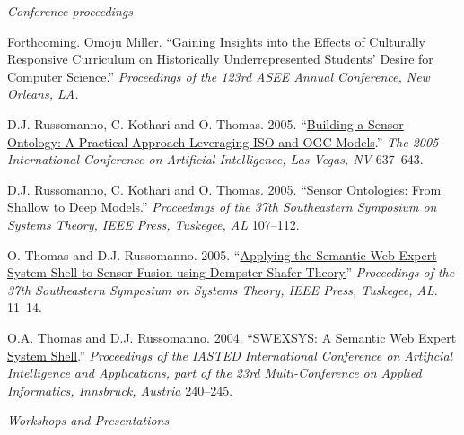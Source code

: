 \documentclass[11pt,article,oneside]{memoir}
\begin{document}
\noindent\emph{Conference proceedings \vspace{0.05in}}
 

\ind Forthcoming. Omoju Miller. ``Gaining Insights into the Effects of Culturally Responsive Curriculum on Historically Underrepresented Students' Desire for Computer Science.'' \emph{Proceedings of the 123rd ASEE Annual Conference, New Orleans, LA.}

\ind D.J. Russomanno, C. Kothari and O. Thomas. 2005. ``\href{https://scholar.google.com/citations?view_op=view_citation&hl=en&user=E7z_wrwAAAAJ&sortby=pubdate&citation_for_view=E7z_wrwAAAAJ:u5HHmVD_uO8C}{Building a Sensor Ontology: A Practical Approach Leveraging ISO and OGC Models}.'' \emph{The 2005 International Conference on Artificial Intelligence, Las Vegas, NV} 637--643. 

\ind D.J. Russomanno, C. Kothari and O. Thomas. 2005. ``\href{http://scholar.google.com/citations?view_op=view_citation&hl=en&user=E7z_wrwAAAAJ&citation_for_view=E7z_wrwAAAAJ:u-x6o8ySG0sC}{Sensor Ontologies: From Shallow to Deep Models.}'' \emph{Proceedings of the 37th Southeastern Symposium on Systems Theory, IEEE Press, Tuskegee, AL} 107--112. 

\ind O. Thomas and D.J. Russomanno. 2005. ``\href{http://scholar.google.com/citations?view_op=view_citation&hl=en&user=E7z_wrwAAAAJ&citation_for_view=E7z_wrwAAAAJ:d1gkVwhDpl0C}{Applying the Semantic Web Expert System Shell to Sensor Fusion using Dempster-Shafer Theory.}'' \emph{Proceedings of the 37th Southeastern Symposium on Systems Theory, IEEE Press, Tuskegee, AL}. 11--14.

\ind O.A. Thomas and D.J. Russomanno. 2004. ``\href{http://scholar.google.com/citations?view_op=view_citation&hl=en&user=E7z_wrwAAAAJ&citation_for_view=E7z_wrwAAAAJ:2osOgNQ5qMEC}{SWEXSYS: A Semantic Web Expert System Shell}.'' \emph{Proceedings of the IASTED International Conference on Artificial Intelligence and Applications, part of the 23rd Multi-Conference on Applied Informatics, Innsbruck, Austria} 240--245. 

\bigskip

\noindent\emph{Workshops and Presentations  \vspace{0.05in}}

\end{document}
